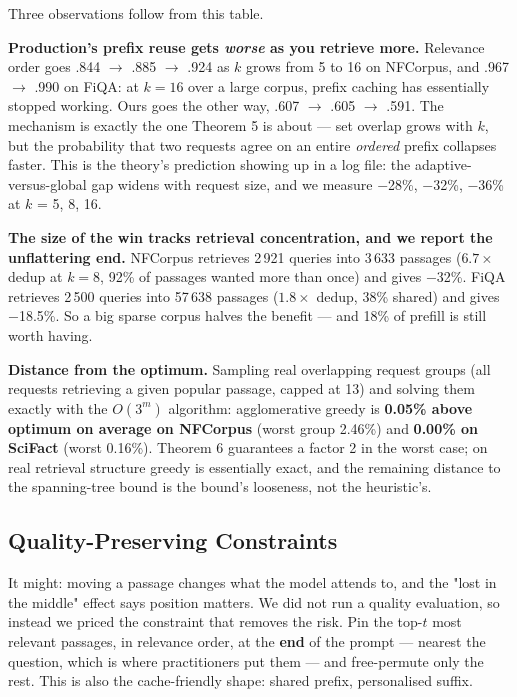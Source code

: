 \documentclass[11pt]{article}
\theoremstyle{plain}
\begin{document}
Three observations follow from this table.

\textbf{Production's prefix reuse gets \emph{worse} as you retrieve more.} Relevance order goes .844 $\to$ .885 $\to$ .924 as $k$ grows from 5 to 16 on NFCorpus, and .967 $\to$ .990 on FiQA: at $k=16$ over a large corpus, prefix caching has essentially stopped working. Ours goes the other way, .607 $\to$ .605 $\to$ .591. The mechanism is exactly the one Theorem 5 is about --- set overlap grows with $k$, but the probability that two requests agree on an entire \emph{ordered} prefix collapses faster. This is the theory's prediction showing up in a log file: the adaptive-versus-global gap widens with request size, and we measure $-$28\%, $-$32\%, $-$36\% at $k$ = 5, 8, 16.

\textbf{The size of the win tracks retrieval concentration, and we report the unflattering end.} NFCorpus retrieves 2\,921 queries into 3\,633 passages ($6.7\times$ dedup at $k=8$, 92\% of passages wanted more than once) and gives $-$32\%. FiQA retrieves 2\,500 queries into 57\,638 passages ($1.8\times$ dedup, 38\% shared) and gives $-$18.5\%. So a big sparse corpus halves the benefit --- and 18\% of prefill is still worth having.

\textbf{Distance from the optimum.} Sampling real overlapping request groups (all requests retrieving a given popular passage, capped at 13) and solving them exactly with the $O(3^m)$ algorithm: agglomerative greedy is \textbf{0.05\% above optimum on average on NFCorpus} (worst group 2.46\%) and \textbf{0.00\% on SciFact} (worst 0.16\%). Theorem 6 guarantees a factor 2 in the worst case; on real retrieval structure greedy is essentially exact, and the remaining distance to the spanning-tree bound is the bound's looseness, not the heuristic's.

\subsection{Quality-Preserving Constraints}

It might: moving a passage changes what the model attends to, and the "lost in the middle" effect says position matters. We did not run a quality evaluation, so instead we priced the constraint that removes the risk. Pin the top-$t$ most relevant passages, in relevance order, at the \textbf{end} of the prompt --- nearest the question, which is where practitioners put them --- and free-permute only the rest. This is also the cache-friendly shape: shared prefix, personalised suffix.
\end{document}
